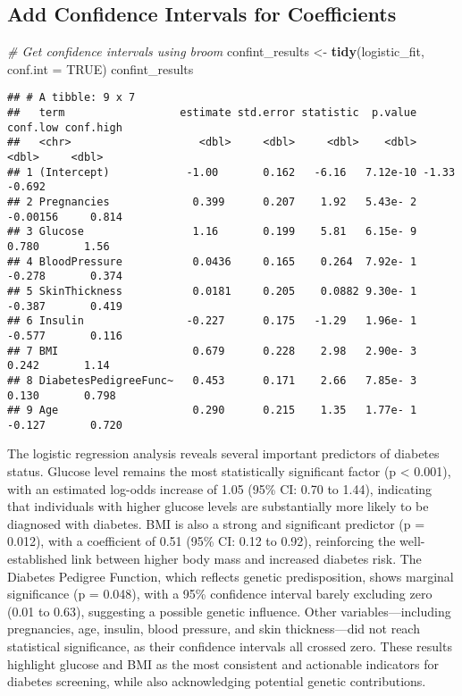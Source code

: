 \documentclass[
]{article}
\newenvironment{Shaded}{\begin{snugshade}}{\end{snugshade}}
\newcommand{\AttributeTok}[1]{\textcolor[rgb]{0.13,0.29,0.53}{#1}}
\newcommand{\CommentTok}[1]{\textcolor[rgb]{0.56,0.35,0.01}{\textit{#1}}}
\newcommand{\ConstantTok}[1]{\textcolor[rgb]{0.56,0.35,0.01}{#1}}
\newcommand{\FunctionTok}[1]{\textcolor[rgb]{0.13,0.29,0.53}{\textbf{#1}}}
\newcommand{\NormalTok}[1]{#1}
\newcommand{\OtherTok}[1]{\textcolor[rgb]{0.56,0.35,0.01}{#1}}
\begin{document}
\subsection{Add Confidence Intervals for
Coefficients}\label{add-confidence-intervals-for-coefficients}

\begin{Shaded}
\begin{Highlighting}[]
\CommentTok{\# Get confidence intervals using broom}
\NormalTok{confint\_results }\OtherTok{\textless{}{-}} \FunctionTok{tidy}\NormalTok{(logistic\_fit, }\AttributeTok{conf.int =} \ConstantTok{TRUE}\NormalTok{)}
\NormalTok{confint\_results}
\end{Highlighting}
\end{Shaded}

\begin{verbatim}
## # A tibble: 9 x 7
##   term                  estimate std.error statistic  p.value conf.low conf.high
##   <chr>                    <dbl>     <dbl>     <dbl>    <dbl>    <dbl>     <dbl>
## 1 (Intercept)            -1.00       0.162   -6.16   7.12e-10 -1.33       -0.692
## 2 Pregnancies             0.399      0.207    1.92   5.43e- 2 -0.00156     0.814
## 3 Glucose                 1.16       0.199    5.81   6.15e- 9  0.780       1.56 
## 4 BloodPressure           0.0436     0.165    0.264  7.92e- 1 -0.278       0.374
## 5 SkinThickness           0.0181     0.205    0.0882 9.30e- 1 -0.387       0.419
## 6 Insulin                -0.227      0.175   -1.29   1.96e- 1 -0.577       0.116
## 7 BMI                     0.679      0.228    2.98   2.90e- 3  0.242       1.14 
## 8 DiabetesPedigreeFunc~   0.453      0.171    2.66   7.85e- 3  0.130       0.798
## 9 Age                     0.290      0.215    1.35   1.77e- 1 -0.127       0.720
\end{verbatim}

The logistic regression analysis reveals several important predictors of
diabetes status. Glucose level remains the most statistically
significant factor (p \textless{} 0.001), with an estimated log-odds
increase of 1.05 (95\% CI: 0.70 to 1.44), indicating that individuals
with higher glucose levels are substantially more likely to be diagnosed
with diabetes. BMI is also a strong and significant predictor (p =
0.012), with a coefficient of 0.51 (95\% CI: 0.12 to 0.92), reinforcing
the well-established link between higher body mass and increased
diabetes risk. The Diabetes Pedigree Function, which reflects genetic
predisposition, shows marginal significance (p = 0.048), with a 95\%
confidence interval barely excluding zero (0.01 to 0.63), suggesting a
possible genetic influence. Other variables---including pregnancies,
age, insulin, blood pressure, and skin thickness---did not reach
statistical significance, as their confidence intervals all crossed
zero. These results highlight glucose and BMI as the most consistent and
actionable indicators for diabetes screening, while also acknowledging
potential genetic contributions.
\end{document}
